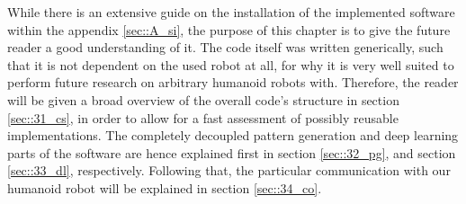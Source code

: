 While there is an extensive guide on the installation of the implemented software within the appendix \ref{sec::A_si}, the purpose of this chapter is to give the future reader a good understanding of it. The code itself was written generically, such that it is not dependent on the used robot at all, for why it is very well suited to perform future research on arbitrary humanoid robots with. Therefore, the reader will be given a broad overview of the overall code's structure in section \ref{sec::31_cs}, in order to allow for a fast assessment of possibly reusable implementations. The completely decoupled pattern generation and deep learning parts of the software are hence explained first in section \ref{sec::32_pg}, and section \ref{sec::33_dl}, respectively. Following that, the particular communication with our humanoid robot will be explained in section \ref{sec::34_co}.







